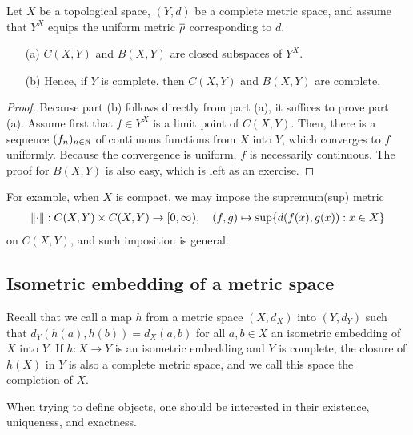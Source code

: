 \begin{thm}\label{Complete spaces of functions}
    Let $X$ be a topological space, $(Y, d)$ be a complete metric space, and assume that $Y^X$ equips the uniform metric $\overline{\rho}$ corresponding to $d$.
    \begin{enumerate}
        \item[(a)]
        {
            $C(X, Y)$ and $B(X, Y)$ are closed subspaces of $Y^X$.
        }
        \item[(b)]
        {
            Hence, if $Y$ is complete, then $C(X, Y)$ and $B(X, Y)$ are complete.
        }
    \end{enumerate}
\end{thm}
\begin{proof}
    Because part (b) follows directly from part (a), it suffices to prove part (a).
    Assume first that $f\in Y^X$ is a limit point of $C(X, Y)$.
    Then, there is a sequence $(f_n)_{n\in{\mathbb{N}}}$ of continuous functions from $X$ into $Y$, which converges to $f$ uniformly.
    Because the convergence is uniform, $f$ is necessarily continuous.
    The proof for $B(X, Y)$ is also easy, which is left as an exercise.
\end{proof}

For example, when $X$ is compact, we may impose the supremum(sup) metric
\begin{align*}
    {\left\lVert{\cdot}\right\rVert}: C(X, Y)\times C(X, Y)\rightarrow[0, \infty),\quad (f, g)\mapsto\sup\{d(f(x), g(x)): x\in X\}
\end{align*}
on $C(X, Y)$, and such imposition is general.

\subsection{Isometric embedding of a metric space}

Recall that we call a map $h$ from a metric space $(X, d_X)$ into $(Y, d_Y)$ such that $d_Y(h(a), h(b))=d_X(a, b)$ for all $a, b\in X$ an isometric embedding of $X$ into $Y$.
If $h: X\rightarrow Y$ is an isometric embedding and $Y$ is complete, the closure of $h(X)$ in $Y$ is also a complete metric space, and we call this space the completion of $X$.

When trying to define objects, one should be interested in their existence, uniqueness, and exactness.

